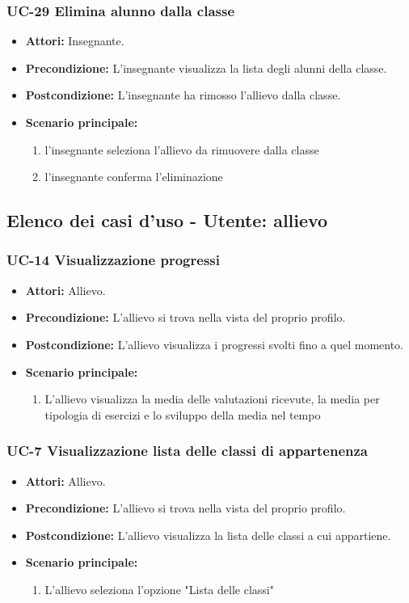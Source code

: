 \subsubsection{UC-29 Elimina alunno dalla classe}		
\begin{itemize}
	\item \textbf{Attori:} Insegnante.
	\item \textbf{Precondizione:} L'insegnante visualizza la lista degli alunni della classe.
	\item \textbf{Postcondizione:} L'insegnante ha rimosso l'allievo dalla classe.
	\item \textbf{Scenario principale:}
	\begin{enumerate}
		\item l'insegnante seleziona l'allievo da rimuovere dalla classe
		\item l'insegnante conferma l'eliminazione
	\end{enumerate}	
\end{itemize}


\subsection{Elenco dei casi d'uso - Utente: allievo}
	\subsubsection{UC-14 Visualizzazione progressi}
	\begin{itemize}
			\item \textbf{Attori:} Allievo.
			\item \textbf{Precondizione:} L'allievo si trova nella vista del proprio profilo.
			\item \textbf{Postcondizione:} L'allievo visualizza i progressi svolti fino a quel momento.
			\item \textbf{Scenario principale:}
				\begin{enumerate}
					\item L'allievo visualizza la media delle valutazioni ricevute, la media per tipologia di esercizi e lo sviluppo della media nel tempo
				\end{enumerate}
	\end{itemize}
	
	\subsubsection{UC-7 Visualizzazione lista delle classi di appartenenza}
		\begin{itemize}
			\item \textbf{Attori:} Allievo.
			\item \textbf{Precondizione:} L'allievo si trova nella vista del proprio profilo.
			\item \textbf{Postcondizione:} L'allievo visualizza la lista delle classi a cui appartiene.
			\item \textbf{Scenario principale:}
			\begin{enumerate}
				\item L'allievo seleziona l'opzione "Lista delle classi"
			\end{enumerate}
		\end{itemize}			


